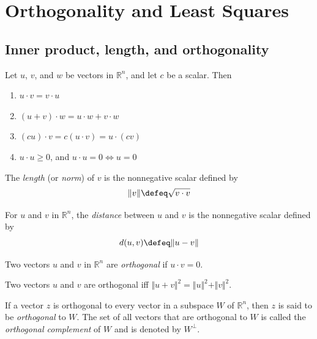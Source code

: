 \documentclass{article}
\begin{document}
\section{Orthogonality and Least Squares}

\subsection{Inner product, length, and orthogonality}

\begin{thm} Let \(u\), \(v\), and \(w\) be vectors in \(\mathbb{R}^n\), and let \(c\) be a scalar. Then
    \begin{enumerate}
        \item[a.] \(u \cdot v=v\cdot u\)
        \item[b.] \((u+v)\cdot w=u\cdot w+v\cdot w\)
        \item[c.] \((cu)\cdot v=c(u\cdot v)=u\cdot(cv)\)
        \item[d.] \(u\cdot u\geq0\), \hspace{.5cm} and \(u\cdot u=0\iff u=0\)
    \end{enumerate}
\end{thm}

\begin{defn}
    The \emph{length} (or \emph{norm}) of \(v\) is the nonnegative scalar defined by \[\Vert v \Vert \defeq \sqrt{v\cdot v}\]
\end{defn}

\begin{defn}
    For \(u\) and \(v\) in \(\mathbb{R}^n\), the \emph{distance} between \(u\) and \(v\) is the nonnegative scalar defined by \[d(u,v) \defeq \Vert u-v \Vert\]
\end{defn}

\begin{defn}
    Two vectors \(u\) and \(v\) in \(\mathbb{R}^n\) are \emph{orthogonal} if \(u\cdot v=0\).
\end{defn}

\begin{thm} 
    Two vectors \(u\) and \(v\) are orthogonal iff \(\Vert u+v \Vert^2=\Vert u \Vert^2 + \Vert v \Vert^2\).
\end{thm}

\begin{defn}
    If a vector \(z\) is orthogonal to every vector in a subspace \(W\) of \(\mathbb{R}^n\), then \(z\) is said to be \emph{orthogonal} to \(W\). The set of all vectors that are orthogonal to \(W\) is called the \emph{orthogonal complement} of \(W\) and is denoted by \(W^{\perp}\).
\end{defn}
\end{document}
